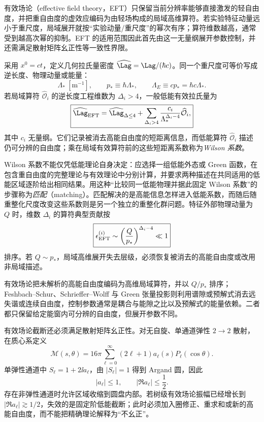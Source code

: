 有效场论（effective field theory，EFT）只保留当前分辨率能够直接激发的轻自由度，并把重自由度的虚效应编码为由轻场构成的局域高维算符。若实验特征动量远小于重尺度，局域展开就按“实验动量/重尺度”的幂次有序；算符维数越高，通常受到越高次幂的抑制。EFT 的适用范围因此首先由这一无量纲展开参数控制，并还需满足散射矩阵幺正性等一致性界限。

采用 \(x^0=ct\)，定义几何拉氏量密度 \(\widehat\Lag=\Lag/(\hbar c)\)。同一个重尺度可等价写成逆长度、物理动量或能量：
\begin{equation}
 \boxed{
 \Lambda_*\ [\mathrm{m^{-1}}],
 \qquad
 p_*\equiv\hbar\Lambda_*,
 \qquad
 \Lambda_E\equiv cp_*=\hbar c\Lambda_*.}
 \label{eq:qft-eft-three-scales-dp42}
\end{equation}
若局域算符 \(\widehat{\mathcal O}_i\) 的逆长度工程维数为 \(\Delta_i>4\)，一般低能有效拉氏量为
\begin{equation}
 \boxed{
 \widehat\Lag_{\rm EFT}
 =\widehat\Lag_{\Delta\le4}
 +\sum_{\Delta_i>4}
 \frac{c_i}{\Lambda_*^{\Delta_i-4}}
 \widehat{\mathcal O}_i,}
 \label{eq:eft-operator-suppression-dp10}
\end{equation}
其中 \(c_i\) 无量纲。它们记录被消去高能自由度的短距离信息，而低能算符 \(\widehat{\mathcal O}_i\) 描述仍可分辨的自由度；乘在局域有效算符前的这些短距离系数称为\emph{Wilson 系数}。

Wilson 系数不能仅凭低能理论自身决定：应选择一组低能外态或 Green 函数，在包含重自由度的完整理论与有效理论中分别计算，并要求两种描述在共同适用的低能区域逐阶给出相同结果。用这种“比较同一低能物理并据此固定 Wilson 系数”的步骤称为\emph{匹配}（matching）。匹配解决的是高能信息怎样进入低能系数，而随后随重整化尺度改变这些系数则是另一个独立的重整化群问题。特征外部物理动量为 \(Q\) 时，维数 \(\Delta_i\) 的算符典型贡献按
\begin{equation}
 \boxed{
 \epsilon_{\rm EFT}^{(i)}
 \sim
 \left(\frac{Q}{p_*}\right)^{\Delta_i-4}
 \ll1}
 \label{eq:eft-power-counting-dp10}
\end{equation}
排序。若 \(Q\sim p_*\)，局域高维展开失去层级，必须恢复被消去的高能自由度或改用非局域描述。

有效场论把未解析的高能自由度编码为高维局域算符，并以 \(Q/p_*\) 排序；Feshbach--Schur、Schrieffer--Wolff 与 Green 张量投影则利用谱隙或预解式消去远失谐或连续自由度，控制参数通常是耦合与能隙之比以及预解式的能量依赖。二者都只保留给定能窗内可分辨的自由度，但展开参数不同。


有效场论截断还必须满足散射矩阵幺正性。对无自旋、单通道弹性 \(2\to2\) 散射，在质心系定义
\begin{equation}
 \boxed{
 \mathcal M(s,\theta)
 =16\pi\sum_{\ell=0}^{\infty}(2\ell+1)
 a_\ell(s)P_\ell(\cos\theta).}
 \label{eq:partial-wave-expansion-dp10}
\end{equation}
单弹性通道中 \(S_\ell=1+2\ii a_\ell\)，由 \(|S_\ell|=1\) 得到 Argand 圆，因此
\begin{equation}
 \boxed{
 |a_\ell|\le1,
 \qquad
 |\Re a_\ell|\le\frac12.}
 \label{eq:partial-wave-unitarity-bound-dp10}
\end{equation}
存在非弹性通道时允许区域收缩到圆盘内部。若树级有效场论振幅已经增长到 \(|\Re a_\ell|\gtrsim1/2\)，失效的是固定阶低能截断；此时必须加入圈修正、重求和或新的高能自由度，而不能把精确理论解释为“不幺正”。

